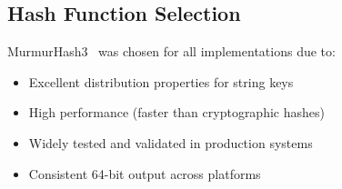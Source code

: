 \documentclass[sigconf]{acmart}
\begin{document}
\subsection{Hash Function Selection}
MurmurHash3~\cite{mmh3docs} was chosen for all implementations due to:
\begin{itemize}
\item Excellent distribution properties for string keys
\item High performance (faster than cryptographic hashes)
\item Widely tested and validated in production systems
\item Consistent 64-bit output across platforms
\end{itemize}
\end{document}
